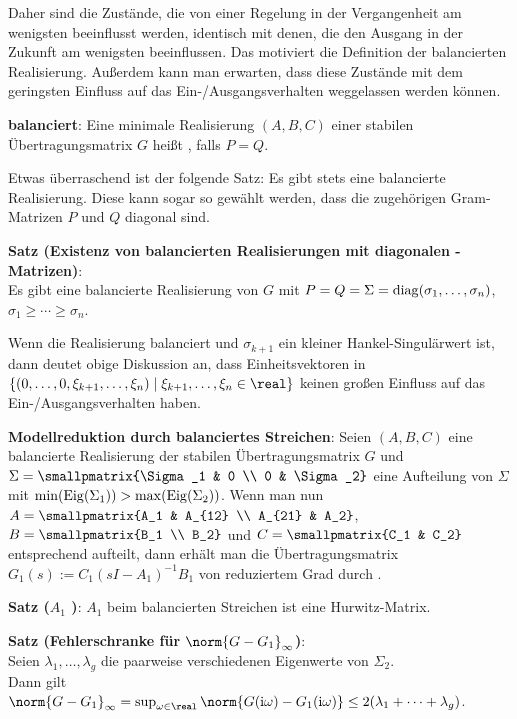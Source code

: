 Daher sind die Zustände, die von einer Regelung in der Vergangenheit am wenigsten beeinflusst
werden, identisch mit denen, die den Ausgang in der Zukunft am wenigsten beeinflussen.
Das motiviert die Definition der balancierten Realisierung.
Außerdem kann man erwarten, dass diese Zustände mit dem geringsten Einfluss auf das
Ein-/Ausgangsverhalten weggelassen werden können.

\linie

\textbf{balanciert}:
Eine minimale Realisierung $(A, B, C)$ einer stabilen Übertragungsmatrix $G$ heißt
, falls $P = Q$.

Etwas überraschend ist der folgende Satz:
Es gibt stets eine balancierte Realisierung.
Diese kann sogar so gewählt werden, dass die zugehörigen Gram-Matrizen $P$ und $Q$ diagonal sind.

\textbf{Satz (Existenz von balancierten Realisierungen mit diagonalen -Matrizen)}:\\
Es gibt eine balancierte Realisierung von $G$ mit
$P = Q = \Sigma = \operatorname{diag}(\sigma_1, \dotsc, \sigma_n)$, $\sigma_1 \ge \dotsb \ge \sigma_n$.

\linie

Wenn die Realisierung balanciert und $\sigma_{k+1}$ ein kleiner Hankel-Singulärwert ist,
dann deutet obige Diskussion an, dass Einheitsvektoren in
$\{(0, \dotsc, 0, \xi_{k+1}, \dotsc, \xi_n) \;|\; \xi_{k+1}, \dotsc, \xi_n \in \real\}$
keinen großen Einfluss auf das Ein-/Ausgangsverhalten haben.

\textbf{Modellreduktion durch balanciertes Streichen}:
Seien $(A, B, C)$ eine balancierte Realisierung der stabilen Übertragungsmatrix $G$ und
$\Sigma = \smallpmatrix{\Sigma_1 & 0 \\ 0 & \Sigma_2}$ eine Aufteilung von $\Sigma$ mit
$\min(\operatorname{Eig}(\Sigma_1)) > \max(\operatorname{Eig}(\Sigma_2))$.
Wenn man nun $A = \smallpmatrix{A_1 & A_{12} \\ A_{21} & A_2}$,
$B = \smallpmatrix{B_1 \\ B_2}$ und $C = \smallpmatrix{C_1 & C_2}$ entsprechend aufteilt, dann
erhält man die Übertragungsmatrix $G_1(s) := C_1 (sI - A_1)^{-1} B_1$ von reduziertem Grad durch
.

\textbf{Satz ($A_1$ )}:
$A_1$ beim balancierten Streichen ist eine Hurwitz-Matrix.

\textbf{Satz (Fehlerschranke für $\norm{G - G_1}_\infty$)}:\\
Seien $\lambda_1, \dotsc, \lambda_g$ die paarweise verschiedenen Eigenwerte von $\Sigma_2$.\\
Dann gilt $\norm{G - G_1}_\infty = \sup_{\omega \in \real} \norm{G(\iu\omega) - G_1(\iu\omega)}
\le 2(\lambda_1 + \dotsb + \lambda_g)$.

\pagebreak
